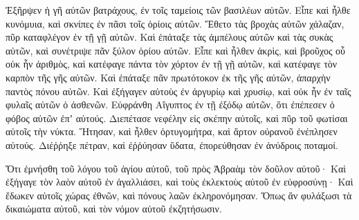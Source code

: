 {Ἐξῆρψεν ἡ γῆ αὐτῶν βατράχους, ἐν τοῖς ταμείοις τῶν βασιλέων αὐτῶν.
Εἶπε καὶ ἦλθε κυνόμυια, καὶ σκνίπες ἐν πᾶσι τοῖς ὁρίοις αὐτῶν.
Ἔθετο τὰς βροχὰς αὐτῶν χάλαζαν, πῦρ καταφλέγον ἐν τῇ γῇ αὐτῶν.
Καὶ ἐπάταξε τὰς ἀμπέλους αὐτῶν καὶ τὰς συκὰς αὐτῶν, καὶ συνέτριψε πᾶν ξύλον ὁρίου αὐτῶν.
Εἶπε καὶ ἦλθεν ἀκρὶς, καὶ βροῦχος οὗ οὐκ ἦν ἀριθμὸς,
καὶ κατέφαγε πάντα τὸν χόρτον ἐν τῇ γῇ αὐτῶν, καὶ κατέφαγε τὸν καρπὸν τῆς γῆς αὐτῶν.
Καὶ ἐπάταξε πᾶν πρωτότοκον ἐκ τῆς γῆς αὐτῶν, ἀπαρχὴν παντὸς πόνου αὐτῶν.
Καὶ ἐξήγαγεν αὐτοὺς ἐν ἀργυρίῳ καὶ χρυσίῳ, καὶ οὐκ ἦν ἐν ταῖς φυλαῖς αὐτῶν ὁ ἀσθενῶν.
Εὐφράνθη Αἴγυπτος ἐν τῇ ἐξόδῳ αὐτῶν, ὅτι ἐπέπεσεν ὁ φόβος αὐτῶν ἐπʼ αὐτούς.
Διεπέτασε νεφέλην εἰς σκέπην αὐτοῖς, καὶ πῦρ τοῦ φωτίσαι αὐτοῖς τὴν νύκτα.
Ἤτησαν, καὶ ἦλθεν ὀρτυγομήτρα, καὶ ἄρτον οὐρανοῦ ἐνέπλησεν αὐτούς.
Διέῤῥηξε πέτραν, καὶ ἐῤῥύησαν ὕδατα, ἐπορεύθησαν ἐν ἀνύδροις ποταμοί.
\par }{\PP {}Ὅτι ἐμνήσθη τοῦ λόγου τοῦ ἁγίου αὐτοῦ, τοῦ πρὸς Ἀβραὰμ τὸν δοῦλον αὐτοῦ·
Καὶ ἐξήγαγε τὸν λαὸν αὐτοῦ ἐν ἀγαλλιάσει, καὶ τοὺς ἐκλεκτοὺς αὐτοῦ ἐν εὐφροσύνῃ·
Καὶ ἔδωκεν αὐτοῖς χώρας ἐθνῶν, καὶ πόνους λαῶν ἐκληρονόμησαν.
Ὅπως ἂν φυλάξωσι τὰ δικαιώματα αὐτοῦ, καὶ τὸν νόμον αὐτοῦ ἐκζητήσωσιν.

}
